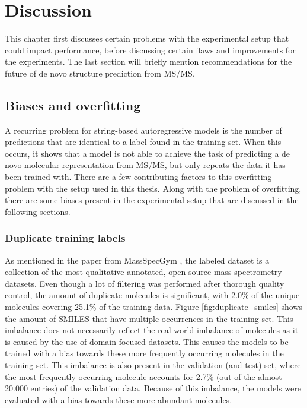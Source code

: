 \chapter{Discussion}
\label{chap:discussion}

This chapter first discusses certain problems with the experimental setup that could impact performance, before discussing certain flaws and improvements for the experiments.
The last section will briefly mention recommendations for the future of de novo structure prediction from \ac{MS/MS}.

\section{Biases and overfitting}
\label{sec:overfitting}
 
A recurring problem for string-based autoregressive models is the number of predictions that are identical to a label found in the training set.
When this occurs, it shows that a model is not able to achieve the task of predicting a de novo molecular representation from \ac{MS/MS}, but only repeats the data it has been trained with.
There are a few contributing factors to this overfitting problem with the setup used in this thesis.
Along with the problem of overfitting, there are some biases present in the experimental setup that are discussed in the following sections. 

\subsection{Duplicate training labels}
\label{sec:duplicate_training_labels}
As mentioned in the paper from MassSpecGym \cite{bushuiev2024massspecgym}, the labeled dataset is a collection of the most qualitative annotated, open-source mass spectrometry datasets.
Even though a lot of filtering was performed after thorough quality control, the amount of duplicate molecules is significant, with 2.0\% of the unique molecules covering 25.1\% of the training data.
Figure \ref{fig:duplicate_smiles} shows the amount of SMILES that have multiple occurrences in the training set.
This imbalance does not necessarily reflect the real-world imbalance of molecules as it is caused by the use of domain-focused datasets.
This causes the models to be trained with a bias towards these more frequently occurring molecules in the training set.
This imbalance is also present in the validation (and test) set, where the most frequently occurring molecule accounts for 2.7\% (out of the almost 20.000 entries) of the validation data.
Because of this imbalance, the models were evaluated with a bias towards these more abundant molecules.

